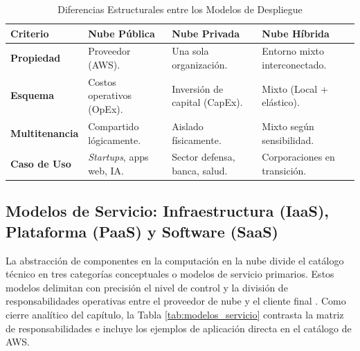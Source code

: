 \documentclass[12pt,a4paper]{article}
\begin{document}
\vspace{0.3cm}
\begin{table}[H]
\centering
\caption{Diferencias Estructurales entre los Modelos de Despliegue}
\label{tab:modelos_despliegue}
\begin{tabular}{ p{2.8cm} p{3.4cm} p{3.4cm} p{3.4cm} }
\toprule
\textbf{Criterio} & \textbf{Nube Pública} & \textbf{Nube Privada} & \textbf{Nube Híbrida} \\
\midrule
\textbf{Propiedad} & Proveedor (AWS). & Una sola organización. & Entorno mixto interconectado. \\
\textbf{Esquema} & Costos operativos (OpEx). & Inversión de capital (CapEx). & Mixto (Local + elástico). \\
\textbf{Multitenancia} & Compartido lógicamente. & Aislado físicamente. & Mixto según sensibilidad. \\
\textbf{Caso de Uso} & \textit{Startups}, apps web, IA. & Sector defensa, banca, salud. & Corporaciones en transición. \\
\bottomrule
\end{tabular}
\end{table}
\vspace{0.3cm}

\subsection{Modelos de Servicio: Infraestructura (IaaS), Plataforma (PaaS) y Software (SaaS)}

La abstracción de componentes en la computación en la nube divide el catálogo técnico en tres categorías conceptuales o modelos de servicio primarios. Estos modelos delimitan con precisión el nivel de control y la división de responsabilidades operativas entre el proveedor de nube y el cliente final \parencite{subashini2011}. Como cierre analítico del capítulo, la Tabla \ref{tab:modelos_servicio} contrasta la matriz de responsabilidades e incluye los ejemplos de aplicación directa en el catálogo de AWS.
\end{document}
